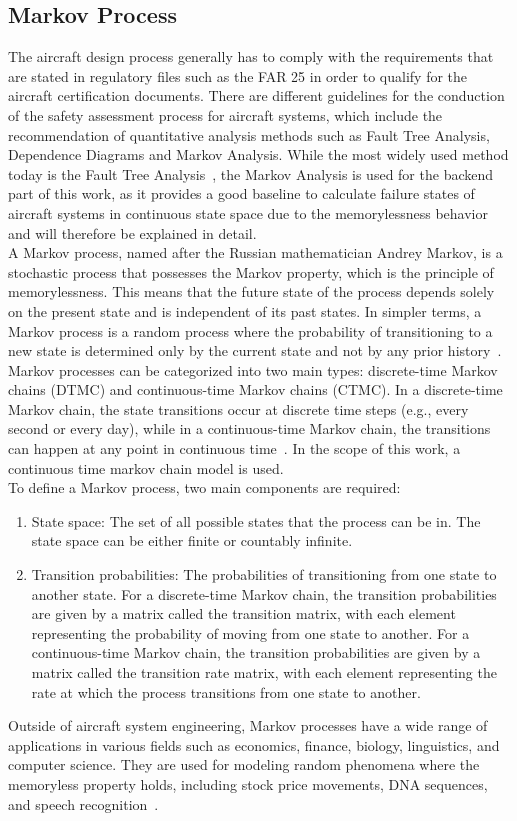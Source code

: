 \subsection{Markov Process}\label{subsec:markov-process}
The aircraft design process generally has to comply with the requirements that are stated in regulatory files such as the FAR 25
in order to qualify for the aircraft certification documents.
There are different guidelines for the conduction of the safety assessment process for aircraft systems, which include the
recommendation of quantitative analysis methods such as Fault Tree Analysis, Dependence Diagrams and Markov Analysis.
While the most widely used method today is the Fault Tree Analysis~\cite{7447967}, the Markov Analysis is used for the backend
part of this work, as it provides a good baseline to calculate failure states of aircraft systems in continuous state space due to the memorylessness behavior
and will therefore be explained in detail.
\\
A Markov process, named after the Russian mathematician Andrey Markov, is a stochastic process that possesses the Markov property,
which is the principle of memorylessness.
This means that the future state of the process depends solely on the present state and is independent of its past states.
In simpler terms, a Markov process is a random process where the probability of transitioning to a new state is determined
only by the current state and not by any prior history~\cite{markov-processes}.
\\
Markov processes can be categorized into two main types:
discrete-time Markov chains (DTMC) and continuous-time Markov chains (CTMC).
In a discrete-time Markov chain, the state transitions occur at discrete time steps (e.g., every second or every day),
while in a continuous-time Markov chain, the transitions can happen at any point in continuous time~\cite{markov-processes, VANKAMPEN200773}.
In the scope of this work, a continuous time markov chain model is used.
\\
To define a Markov process, two main components are required:
\begin{enumerate}
    \item State space: The set of all possible states that the process can be in. The state space can be either finite or countably infinite.
    \item Transition probabilities: The probabilities of transitioning from one state to another state. For a discrete-time Markov chain, the transition probabilities are given by a matrix called the transition matrix, with each element representing the probability of moving from one state to another. For a continuous-time Markov chain, the transition probabilities are given by a matrix called the transition rate matrix, with each element representing the rate at which the process transitions from one state to another.
\end{enumerate}
Outside of aircraft system engineering, Markov processes have a wide range of applications in various fields such as economics, finance, biology, linguistics,
and computer science.
They are used for modeling random phenomena where the memoryless property holds,
including stock price movements, DNA sequences, and speech recognition~\cite{markov-usage}.

